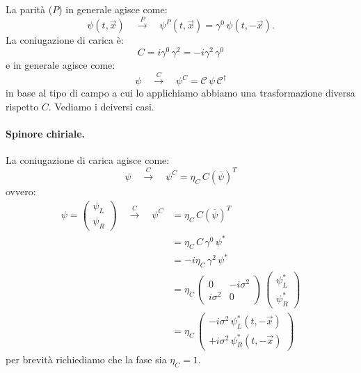 La parità ($P$) in generale agisce come:
\begin{equation}
    \psi(t,\vec{x}) \quad \overset{P}{\longrightarrow}\quad \psi^P(t,\vec{x}) = \gamma^0\, \psi(t,-\vec{x}).
\end{equation}
La coniugazione di carica è:
\begin{equation}
    C = i\gamma^0\, \gamma^2 = -i\gamma^2\, \gamma^0
\end{equation}
e in generale agisce come:
\begin{equation}
    \psi \quad \overset{C}{\longrightarrow}\quad \psi^C = \mathcal{C}\, \psi\, \mathcal{C}^\dagger
\end{equation}
in base al tipo di campo a cui lo applichiamo abbiamo una trasformazione diversa rispetto $C$. Vediamo i deiversi casi.

\paragraph{Spinore chiriale.}La coniugazione di carica agisce come:
\begin{equation}
    \psi \quad \overset{C}{\longrightarrow}\quad \psi^C = \eta_{C}\, C(\overline{\psi})^T
\end{equation}
ovvero:
\begin{align}
    \psi = \begin{pmatrix}
        \psi_L \\
        \psi_R
    \end{pmatrix} \quad \overset{C}{\longrightarrow}\quad \psi^C &= \eta_{C}\, C(\overline{\psi})^T \\
    &= \eta_C\, C\, \gamma^0\, \psi^* \\
    &= -i\eta_C\, \gamma^2\, \psi^* \\
    &= \eta_C\, \begin{pmatrix}
        0 & -i\sigma^2 \\
        i\sigma^2 & 0
    \end{pmatrix}\, \begin{pmatrix}
        \psi_L^* \\
        \psi_R^*
    \end{pmatrix} \\
    &= \eta_C\, \begin{pmatrix}
        -i\sigma^2\, \psi_L^*(t,-\vec{x}) \\
        +i\sigma^2\, \psi_R^*(t,-\vec{x})
    \end{pmatrix}
\end{align}
per brevità richiediamo che la fase sia $\eta_C = 1$.

